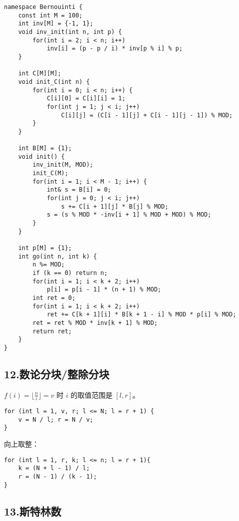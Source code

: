 \documentclass[]{article}
\begin{document}
\begin{verbatim}
namespace Bernouinti {
    const int M = 100;
    int inv[M] = {-1, 1};
    void inv_init(int n, int p) {
        for(int i = 2; i < n; i++)
            inv[i] = (p - p / i) * inv[p % i] % p;
    }

    int C[M][M];
    void init_C(int n) {
        for(int i = 0; i < n; i++) {
            C[i][0] = C[i][i] = 1;
            for(int j = 1; j < i; j++)
                C[i][j] = (C[i - 1][j] + C[i - 1][j - 1]) % MOD;
        }
    }

    int B[M] = {1};
    void init() {
        inv_init(M, MOD);
        init_C(M);
        for(int i = 1; i < M - 1; i++) {
            int& s = B[i] = 0;
            for(int j = 0; j < i; j++)
                s += C[i + 1][j] * B[j] % MOD;
            s = (s % MOD * -inv[i + 1] % MOD + MOD) % MOD;
        }
    }

    int p[M] = {1};
    int go(int n, int k) {
        n %= MOD;
        if (k == 0) return n;
        for(int i = 1; i < k + 2; i++)
            p[i] = p[i - 1] * (n + 1) % MOD;
        int ret = 0;
        for(int i = 1; i < k + 2; i++)
            ret += C[k + 1][i] * B[k + 1 - i] % MOD * p[i] % MOD;
        ret = ret % MOD * inv[k + 1] % MOD;
        return ret;
    }
}
\end{verbatim}

\hypertarget{ux6570ux8bbaux5206ux5757ux6574ux9664ux5206ux5757}{%
\subsection{12.数论分块/整除分块}\label{ux6570ux8bbaux5206ux5757ux6574ux9664ux5206ux5757}}

\(f(i) = \lfloor \frac{n}{i} \rfloor=v\) 时 \(i\) 的取值范围是
\([l,r]\)。

\begin{verbatim}
for (int l = 1, v, r; l <= N; l = r + 1) {
    v = N / l; r = N / v;
}
\end{verbatim}

向上取整：

\begin{verbatim}
for (int l = 1, r, k; l <= n; l = r + 1){
    k = (N + l - 1) / l;
    r = (N - 1) / (k - 1);
}
\end{verbatim}

\hypertarget{ux65afux7279ux6797ux6570}{%
\subsection{13.斯特林数}\label{ux65afux7279ux6797ux6570}}
\end{document}
